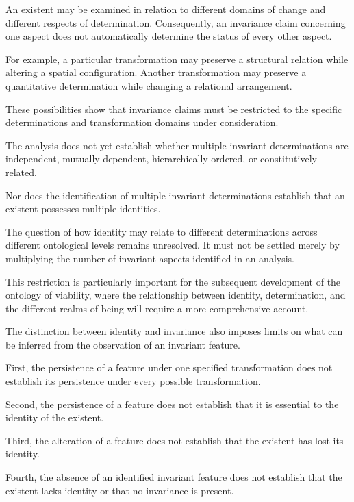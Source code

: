 An existent may be examined in relation to different
domains of change and different respects of
determination. Consequently, an invariance claim
concerning one aspect does not automatically
determine the status of every other aspect.

For example, a particular transformation may
preserve a structural relation while altering
a spatial configuration. Another transformation
may preserve a quantitative determination while
changing a relational arrangement.

These possibilities show that invariance claims
must be restricted to the specific determinations
and transformation domains under consideration.

The analysis does not yet establish whether
multiple invariant determinations are independent,
mutually dependent, hierarchically ordered, or
constitutively related.

Nor does the identification of multiple invariant
determinations establish that an existent possesses
multiple identities.

The question of how identity may relate to different
determinations across different ontological levels
remains unresolved. It must not be settled merely
by multiplying the number of invariant aspects
identified in an analysis.

This restriction is particularly important for
the subsequent development of the ontology of
viability, where the relationship between identity,
determination, and the different realms of being
will require a more comprehensive account.


The distinction between identity and invariance
also imposes limits on what can be inferred from
the observation of an invariant feature.

First, the persistence of a feature under one
specified transformation does not establish its
persistence under every possible transformation.

Second, the persistence of a feature does not
establish that it is essential to the identity
of the existent.

Third, the alteration of a feature does not
establish that the existent has lost its identity.

Fourth, the absence of an identified invariant
feature does not establish that the existent
lacks identity or that no invariance is present.

